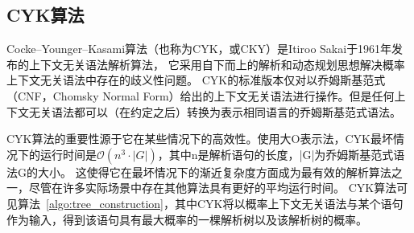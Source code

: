 



\subsection{CYK算法}

Cocke–Younger–Kasami算法（也称为CYK，或CKY）是Itiroo Sakai\cite{mey1965international}于1961年发布的上下文无关语法解析算法，
它采用自下而上的解析和动态规划思想解决概率上下文无关语法中存在的歧义性问题。
CYK的标准版本仅对以乔姆斯基范式（CNF，Chomsky Normal Form）给出的上下文无关语法进行操作。但是任何上下文无关语法都可以（在约定之后）转换为表示相同语言的乔姆斯基范式语法。

CYK算法的重要性源于它在某些情况下的高效性。使用大O表示法，CYK最坏情况下的运行时间是$\displaystyle \mathcal{O} (n^{3} \cdot |G|)$，其中n是解析语句的长度，|G|为乔姆斯基范式语法G的大小。
这使得它在最坏情况下的渐近复杂度方面成为最有效的解析算法之一，尽管在许多实际场景中存在其他算法具有更好的平均运行时间\cite{sipser1997context}。
CYK算法可见算法~\ref{algo:tree_construction}，其中CYK将以概率上下文无关语法与某个语句作为输入，得到该语句具有最大概率的一棵解析树以及该解析树的概率。


